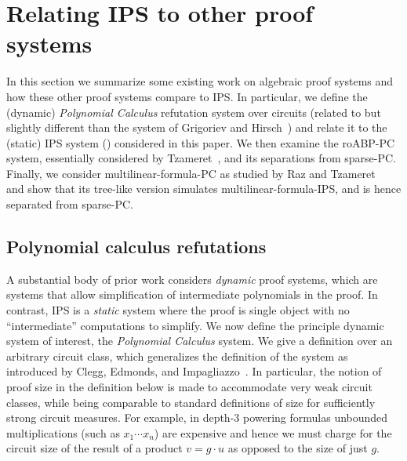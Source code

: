 \documentclass{toc}
\begin{document}
%
%
%

\appendix



%
%
%
%

\section{Relating IPS to other proof systems}\label{sec:alg-proofs}

In this section we summarize some existing work on algebraic proof systems and how these other proof systems compare to IPS\@. In particular, we define the (dynamic) \emph{Polynomial Calculus} refutation system over circuits (related to but slightly different than the system of Grigoriev and Hirsch~\cite{GrigorievHirsch03}) and relate it to the (static) IPS system (\cite{Pitassi97,DBLP:journals/jacm/GrochowP18}) considered in this paper.  We then examine the roABP-PC system, essentially considered by Tzameret~\cite{Tzameret11}, and its separations from sparse-PC\@.  Finally, we consider multilinear-formula-PC as studied by Raz and Tzameret~\cite{RazTzameret08a,RazTzameret08b} and show that its tree-like version simulates multilinear-formula-IPS, and is hence separated from sparse-PC.

\subsection{Polynomial calculus refutations}

A substantial body of prior work considers \emph{dynamic} proof systems, which are systems that allow simplification of intermediate polynomials in the proof.  In contrast, IPS is a \emph{static} system where the proof is single object with no ``intermediate'' computations to simplify.  We now define the principle dynamic system of interest, the \emph{Polynomial Calculus} system.  We give a definition over an arbitrary circuit class, which generalizes the definition of the system as introduced by Clegg, Edmonds, and Impagliazzo~\cite{CleggEI96}.  In particular, the notion of proof size in the
%
definition below   %
is made to accommodate very weak circuit classes, while being comparable to standard definitions of size for sufficiently strong circuit measures.  For example, in depth-3 powering formulas unbounded multiplications (such as $x_1\cdots x_n$) are expensive and hence we must charge for the circuit size of the result of a product $v=g\cdot u$ as opposed to the size of just $g$.
\end{document}
